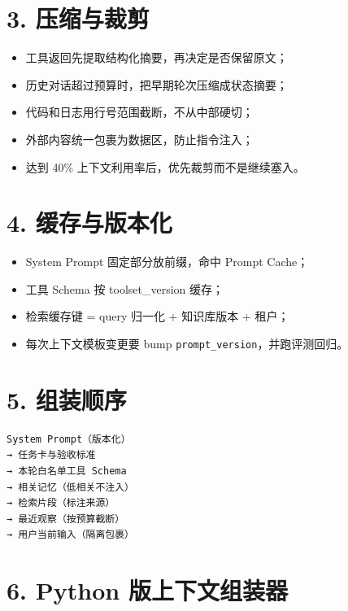 \documentclass[9pt,a4paper,twocolumn]{ctexart}
\begin{document}
\section*{3. 压缩与裁剪}

\begin{itemize}[itemsep=1pt, topsep=2pt]
  \item 工具返回先提取结构化摘要，再决定是否保留原文；
  \item 历史对话超过预算时，把早期轮次压缩成状态摘要；
  \item 代码和日志用行号范围截断，不从中部硬切；
  \item 外部内容统一包裹为数据区，防止指令注入；
  \item 达到 40\% 上下文利用率后，优先裁剪而不是继续塞入。
\end{itemize}


\section*{4. 缓存与版本化}

\begin{itemize}[itemsep=1pt, topsep=2pt]
  \item System Prompt 固定部分放前缀，命中 Prompt Cache；
  \item 工具 Schema 按 toolset\_version 缓存；
  \item 检索缓存键 = query 归一化 + 知识库版本 + 租户；
  \item 每次上下文模板变更要 bump \texttt{prompt\_version}，并跑评测回归。
\end{itemize}


\section*{5. 组装顺序}


\begin{lstlisting}
System Prompt（版本化）
→ 任务卡与验收标准
→ 本轮白名单工具 Schema
→ 相关记忆（低相关不注入）
→ 检索片段（标注来源）
→ 最近观察（按预算截断）
→ 用户当前输入（隔离包裹）
\end{lstlisting}



\section*{6. Python 版上下文组装器}
\end{document}
